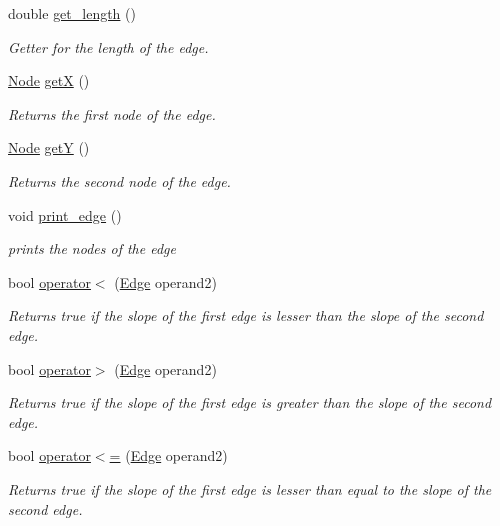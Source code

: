 \begin{DoxyCompactItemize}
double \hyperlink{classEdge_a4006dc75fc999a1d004601ff3c6dab35}{get\+\_\+length} ()
\begin{DoxyCompactList}\small\item\em Getter for the length of the edge. \end{DoxyCompactList}\item 
\hyperlink{classNode}{Node} \hyperlink{classEdge_a95807a93235f14fdc8e10a420d49ba23}{getX} ()
\begin{DoxyCompactList}\small\item\em Returns the first node of the edge. \end{DoxyCompactList}\item 
\hyperlink{classNode}{Node} \hyperlink{classEdge_a6ac7815e007920fbd1ba9fe9180f03c1}{getY} ()
\begin{DoxyCompactList}\small\item\em Returns the second node of the edge. \end{DoxyCompactList}\item 
\mbox{\label{classEdge_a51a01b34abd9cc79866bcead60941bdc}} 
void \hyperlink{classEdge_a51a01b34abd9cc79866bcead60941bdc}{print\+\_\+edge} ()
\begin{DoxyCompactList}\small\item\em prints the nodes of the edge \end{DoxyCompactList}\item 
bool \hyperlink{classEdge_a1144b2120acd52fb6ca2a7374ad1edd5}{operator$<$} (\hyperlink{classEdge}{Edge} operand2)
\begin{DoxyCompactList}\small\item\em Returns true if the slope of the first edge is lesser than the slope of the second edge. \end{DoxyCompactList}\item 
bool \hyperlink{classEdge_afaac3a288de3d535492c88e3b38c1106}{operator$>$} (\hyperlink{classEdge}{Edge} operand2)
\begin{DoxyCompactList}\small\item\em Returns true if the slope of the first edge is greater than the slope of the second edge. \end{DoxyCompactList}\item 
bool \hyperlink{classEdge_a60d555298a70e0fa4c75705d09386cc2}{operator$<$=} (\hyperlink{classEdge}{Edge} operand2)
\begin{DoxyCompactList}\small\item\em Returns true if the slope of the first edge is lesser than equal to the slope of the second edge. \end{DoxyCompactList}\item 

\end{DoxyCompactItemize}
